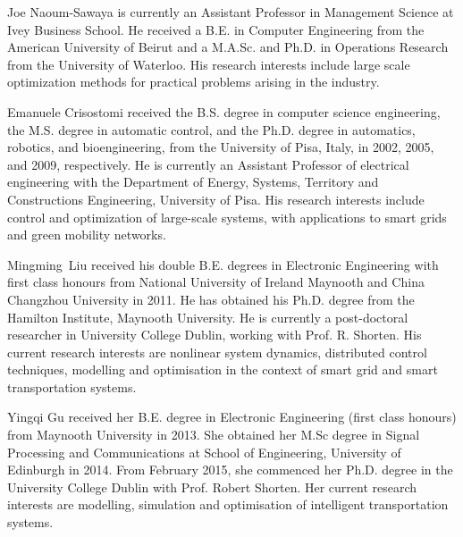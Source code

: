 \documentclass[journal]{IEEEtran}
\begin{document}





\begin{IEEEbiography}{Joe Naoum-Sawaya}
is currently an Assistant Professor in Management Science at Ivey Business School. He received a B.E. in Computer Engineering from the American University of Beirut and a M.A.Sc. and Ph.D. in Operations Research from the University of Waterloo. His research interests include large scale optimization methods for practical problems arising in the industry. 
\end{IEEEbiography}


\begin{IEEEbiography}{Emanuele Crisostomi}
	received the B.S. degree in computer science engineering, the M.S. degree in automatic control, and the Ph.D. degree in automatics, robotics, and bioengineering, from the University of Pisa, Italy, in 2002, 2005, and 2009, respectively. He is currently an Assistant Professor of electrical engineering with the Department of Energy, Systems, Territory and Constructions Engineering, University of Pisa. His research interests include control and optimization of large-scale systems, with applications to smart grids and green mobility networks.
\end{IEEEbiography}


\begin{IEEEbiography}{Mingming~Liu}
	received his double B.E. degrees in Electronic Engineering with first class honours from National University of Ireland Maynooth and China Changzhou University in 2011. He has obtained his Ph.D. degree from the Hamilton Institute, Maynooth University. He is currently a post-doctoral researcher in University College Dublin, working with Prof. R. Shorten. His current research interests are nonlinear system dynamics, distributed control techniques, modelling and optimisation in the context of smart grid and smart transportation systems. 		
\end{IEEEbiography}


\begin{IEEEbiography}{Yingqi Gu}
	received her B.E. degree in Electronic Engineering (first class honours) from Maynooth University in 2013. She obtained her M.Sc degree in Signal Processing and Communications at School of Engineering, University of Edinburgh in 2014. From February 2015, she commenced her Ph.D. degree in the University College Dublin with Prof. Robert Shorten. Her current research interests are modelling, simulation and optimisation of intelligent transportation systems.   		
\end{IEEEbiography}
\end{document}
